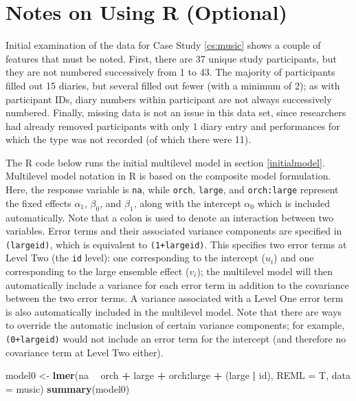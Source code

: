 \documentclass[
]{krantz}
\newenvironment{Shaded}{\begin{snugshade}}{\end{snugshade}}
\newcommand{\DataTypeTok}[1]{\textcolor[rgb]{0.27,0.27,0.27}{#1}}
\newcommand{\KeywordTok}[1]{\textcolor[rgb]{0.27,0.27,0.27}{\textbf{#1}}}
\newcommand{\NormalTok}[1]{#1}
\newcommand{\OperatorTok}[1]{\textcolor[rgb]{0.43,0.43,0.43}{\textbf{#1}}}
\newcommand{\StringTok}[1]{\textcolor[rgb]{0.5,0.5,0.5}{#1}}
\begin{document}
\hypertarget{notesr8}{%
\section{Notes on Using R (Optional)}\label{notesr8}}

Initial examination of the data for Case Study \ref{cs:music} shows a couple of features that must be noted. First, there are 37 unique study participants, but they are not numbered successively from 1 to 43. The majority of participants filled out 15 diaries, but several filled out fewer (with a minimum of 2); as with participant IDs, diary numbers within participant are not always successively numbered. Finally, missing data is not an issue in this data set, since researchers had already removed participants with only 1 diary entry and performances for which the type was not recorded (of which there were 11).

The R code below runs the initial multilevel model  in section \ref{initialmodel}. Multilevel model notation in R is based on the composite model formulation. Here, the response variable is \texttt{na}, while \texttt{orch}, \texttt{large}, and \texttt{orch:large} represent the fixed effects \(\alpha_{1}\), \(\beta_{0}\), and \(\beta_{1}\), along with the intercept \(\alpha_{0}\) which is included automatically. Note that a colon is used to denote an interaction between two variables. Error terms and their associated variance components are specified in \texttt{(large\textbar{}id)}, which is equivalent to \texttt{(1+large\textbar{}id)}. This specifies two error terms at Level Two (the \texttt{id} level): one corresponding to the intercept (\(u_{i}\)) and one corresponding to the large ensemble effect (\(v_{i}\)); the multilevel model will then automatically include a variance for each error term in addition to the covariance between the two error terms. A variance associated with a Level One error term is also automatically included in the multilevel model. Note that there are ways to override the automatic inclusion of certain variance components; for example, \texttt{(0+large\textbar{}id)} would not include an error term for the intercept (and therefore no covariance term at Level Two either).

\begin{Shaded}
\begin{Highlighting}[]
\NormalTok{model0 <-}\StringTok{ }\KeywordTok{lmer}\NormalTok{(na }\OperatorTok{~}\StringTok{ }\NormalTok{orch }\OperatorTok{+}\StringTok{ }\NormalTok{large }\OperatorTok{+}\StringTok{ }\NormalTok{orch}\OperatorTok{:}\NormalTok{large }\OperatorTok{+}
\StringTok{  }\NormalTok{(large }\OperatorTok{|}\StringTok{ }\NormalTok{id), }\DataTypeTok{REML =}\NormalTok{ T, }\DataTypeTok{data =}\NormalTok{ music)}
\KeywordTok{summary}\NormalTok{(model0)}
\end{Highlighting}
\end{Shaded}
\end{document}
